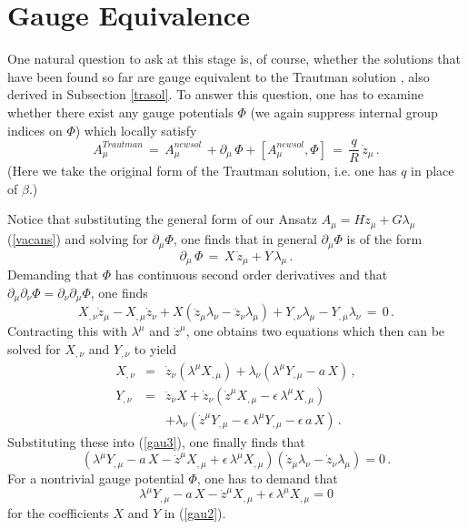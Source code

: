 \documentclass[a4paper,twocolumn,prd,showpacs,amsmath,amssymb]{revtex4}
\begin{document}
\section{\label{gauge} Gauge Equivalence}

One natural question to ask at this stage is, of course, whether the solutions
that have been found so far are gauge equivalent to the Trautman
solution \cite{traut}, also derived in Subsection \ref{trasol}. To answer this
question, one has to examine whether there exist any gauge potentials $\Phi$
(we again suppress internal group indices on $\Phi$) which locally satisfy
\begin{equation}
A_{\mu}^{Trautman} \, = \, A_{\mu}^{new sol} \, + \partial_{\mu} \, \Phi +
[A_{\mu}^{new sol},\Phi] \, = \, \frac{q}{R} \, \dot{z}_{\mu} \, . \label{gau1}
\end{equation}
(Here we take the original form of the Trautman solution, i.e. one has $q$
in place of $\beta$.)

Notice that substituting the general form of our Ansatz
$A_{\mu}=H \dot{z}_{\mu} + G \lambda_{\mu}$ (\ref{vacans}) and solving
for $\partial_{\mu} \Phi$, one finds that in general $\partial_{\mu} \Phi$
is of the form
\begin{equation}
\partial_{\mu} \, \Phi \, = \, X \, \dot{z}_{\mu} + Y \, \lambda_{\mu} \, .
\label{gau2}
\end{equation}
Demanding that $\Phi$ has continuous second order derivatives and that
$\partial_{\mu} \partial_{\nu} \Phi = \partial_{\nu} \partial_{\mu} \Phi$,
one finds
\begin{equation}
X_{,\nu} \dot{z}_{\mu} - X_{,\mu} \dot{z}_{\nu}
+ X (\ddot{z}_{\mu} \lambda_{\nu} - \ddot{z}_{\nu} \lambda_{\mu})
+ Y_{,\nu} \lambda_{\mu} - Y_{,\mu} \lambda_{\nu} \, = \, 0 \, .
\label{gau3}
\end{equation}
Contracting this with $\lambda^{\mu}$ and $\dot{z}^{\mu}$, one obtains two
equations which then can be solved for $X_{,\nu}$ and $Y_{,\nu}$ to yield
\begin{eqnarray}
X_{,\nu} & = & \dot{z}_{\nu} (\lambda^{\mu} X_{,\mu})
+ \lambda_{\nu} (\lambda^{\mu} Y_{,\mu} - a \, X) \, , \label{xnueq} \\
Y_{,\nu} & = & \ddot{z}_{\nu} X + \dot{z}_{\nu}
(\dot{z}^{\mu} X_{,\mu} - \epsilon \, \lambda^{\mu} X_{,\mu}) \nonumber \\
& & + \lambda_{\nu} (\dot{z}^{\mu} Y_{,\mu} - \epsilon \, \lambda^{\mu} Y_{,\mu}
- \epsilon \, a \, X) \, . \label{ynueq}
\end{eqnarray}
Substituting these into (\ref{gau3}), one finally finds that
\[ (\lambda^{\mu} Y_{,\mu} - a \, X - \dot{z}^{\mu} X_{,\mu}
+ \epsilon \, \lambda^{\mu} X_{,\mu})
(\dot{z}_{\mu} \lambda_{\nu} - \dot{z}_{\nu} \lambda_{\mu}) = 0 \, . \]
For a nontrivial gauge potential $\Phi$, one has to demand that
\begin{equation}
\lambda^{\mu} Y_{,\mu} - a \, X - \dot{z}^{\mu} X_{,\mu}
+ \epsilon \, \lambda^{\mu} X_{,\mu} = 0 \label{omcon}
\end{equation}
for the coefficients $X$ and $Y$ in (\ref{gau2}).
\end{document}
